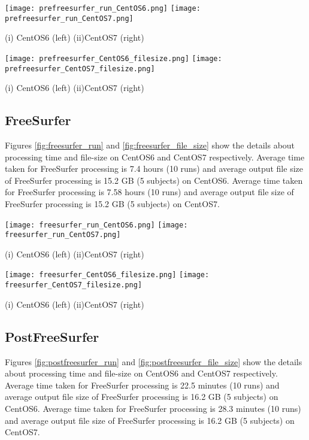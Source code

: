 \begin{center}
\texttt{[image: prefreesurfer\_run\_CentOS6.png]}%
\texttt{[image: prefreesurfer\_run\_CentOS7.png]}
  \caption*{(i) CentOS6 (left) (ii)CentOS7 (right)}
\label{fig:prefreesurfer_run}
\end{center}

\begin{center}
\texttt{[image: prefreesurfer\_CentOS6\_filesize.png]}%
\texttt{[image: prefreesurfer\_CentOS7\_filesize.png]}
\caption*{(i) CentOS6 (left) (ii)CentOS7 (right)}
\label{fig:prefreesurfer_file_size}
\end{center}

\subsection{FreeSurfer}
Figures \ref{fig:freesurfer_run} and \ref{fig:freesurfer_file_size} show the details about processing time and file-size on CentOS6 and CentOS7 respectively.
Average time taken for FreeSurfer processing is 7.4 hours (10 runs) and average output file size of FreeSurfer processing is 15.2 GB (5 subjects) on CentOS6.
Average time taken for FreeSurfer processing is 7.58 hours (10 runs) and average output file size of FreeSurfer processing is 15.2 GB (5 subjects) on CentOS7.

\begin{center}
\texttt{[image: freesurfer\_run\_CentOS6.png]}%
\texttt{[image: freesurfer\_run\_CentOS7.png]}
\caption*{(i) CentOS6 (left) (ii)CentOS7 (right)}
\label{fig:freesurfer_run}
\end{center}

\begin{center}
\texttt{[image: freesurfer\_CentOS6\_filesize.png]}%
\texttt{[image: freesurfer\_CentOS7\_filesize.png]}
\caption*{(i) CentOS6 (left) (ii)CentOS7 (right)}
\label{fig:freesurfer_file_size}
\end{center}

\subsection{PostFreeSurfer}
Figures \ref{fig:postfreesurfer_run} and \ref{fig:postfreesurfer_file_size} show the details about processing time and file-size on CentOS6 and CentOS7 respectively.
Average time taken for FreeSurfer processing is 22.5 minutes (10 runs) and average output file size of FreeSurfer processing is 16.2 GB (5 subjects) on CentOS6.
Average time taken for FreeSurfer processing is 28.3 minutes (10 runs) and average output file size of FreeSurfer processing is 16.2 GB (5 subjects) on CentOS7.

